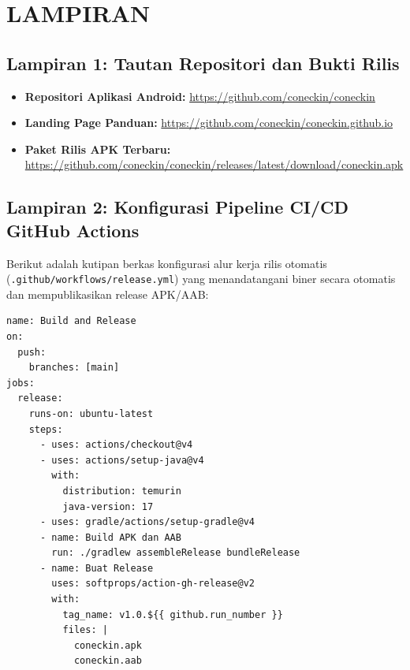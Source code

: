 \section*{LAMPIRAN}
{}

\subsection*{Lampiran 1: Tautan Repositori dan Bukti Rilis}
\begin{itemize}
    \item \textbf{Repositori Aplikasi Android:} \url{https://github.com/coneckin/coneckin}
    \item \textbf{Landing Page Panduan:} \url{https://github.com/coneckin/coneckin.github.io}
    \item \textbf{Paket Rilis APK Terbaru:} \url{https://github.com/coneckin/coneckin/releases/latest/download/coneckin.apk}
\end{itemize}

\subsection*{Lampiran 2: Konfigurasi Pipeline CI/CD GitHub Actions}
Berikut adalah kutipan berkas konfigurasi alur kerja rilis otomatis (\texttt{.github/workflows/release.yml}) yang menandatangani biner secara otomatis dan mempublikasikan release APK/AAB:

\begin{verbatim}
name: Build and Release
on:
  push:
    branches: [main]
jobs:
  release:
    runs-on: ubuntu-latest
    steps:
      - uses: actions/checkout@v4
      - uses: actions/setup-java@v4
        with:
          distribution: temurin
          java-version: 17
      - uses: gradle/actions/setup-gradle@v4
      - name: Build APK dan AAB
        run: ./gradlew assembleRelease bundleRelease
      - name: Buat Release
        uses: softprops/action-gh-release@v2
        with:
          tag_name: v1.0.${{ github.run_number }}
          files: |
            coneckin.apk
            coneckin.aab
\end{verbatim}
